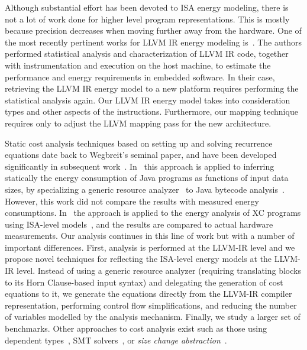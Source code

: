 \documentclass[9pt,preprint]{sigplanconf}
\begin{document}
Although substantial effort has been devoted to ISA energy modeling, there is
not a lot of work done for higher level program representations. This is mostly
because precision decreases when moving further away from the hardware. One of
the most recently pertinent works for LLVM IR energy modeling is~\cite{Brandolese2011}.
The authors performed statistical analysis and characterization of LLVM IR code,
together with instrumentation and execution on the host machine, to estimate
the performance and energy requirements in embedded software. In their case,
retrieving the LLVM IR energy model to a new platform requires performing the
statistical analysis again. Our LLVM IR energy model takes into consideration
types and other aspects of the instructions. Furthermore, our mapping technique
requires only to adjust the LLVM mapping pass for the new architecture.

Static cost analysis techniques based on setting up and solving recurrence
equations date back to Wegbreit's \cite{DBLP:journals/cacm/Wegbreit75} seminal
paper, and have been developed significantly in subsequent
work~\cite{Rosendahl89, granularity, low-bounds-ilps97, vh-03, resource-iclp07,
AlbertAGP11a}. In~\cite{NMHLFM08} this approach is applied to inferring
statically the energy consumption of Java programs as functions of input data
sizes, by specializing a generic resource analyzer~\cite{resource-iclp07,
ciaopp-sas03-journal-scp} to Java bytecode analysis~\cite{resources-bytecode09}.
However, this work did not compare the results with measured energy
consumptions.  In~\cite{isa-energy-lopstr13} the approach is applied to the
energy analysis of XC programs using ISA-level models~\cite{Kerrison13}, and the
results are compared to actual hardware measurements.  Our analysis continues in
this line of work but with a number of important differences.  First, analysis
is performed at the LLVM-IR level and we propose novel techniques for reflecting
the ISA-level energy models at the LLVM-IR level.  Instead of using a
generic resource analyzer (requiring translating blocks to its Horn Clause-based
input syntax) and delegating the generation of cost equations to it, we generate
the equations directly from the LLVM-IR compiler representation, performing
control flow simplifications, and reducing the number of variables modelled by
the analysis mechanism.  Finally, we study a larger set of benchmarks.
Other approaches to cost analysis exist such as those using dependent
types~\cite{DBLP:journals/toplas/0002AH12}, SMT solvers~\cite{Alonso2012}, or
\emph{size change abstraction}~\cite{DBLP:journals/corr/abs-1203-5303}.
\end{document}
